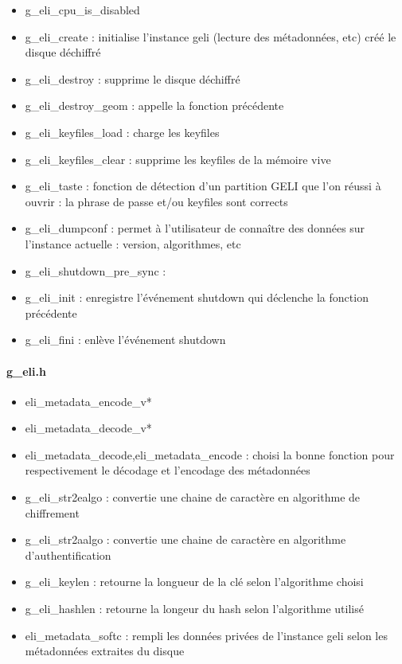 \begin{itemize}
	\item g\_eli\_cpu\_is\_disabled
	\item g\_eli\_create : initialise l'instance geli (lecture des métadonnées, etc)
		créé le disque déchiffré
	\item g\_eli\_destroy : supprime le disque déchiffré
	\item g\_eli\_destroy\_geom : appelle la fonction précédente
	\item g\_eli\_keyfiles\_load : charge les keyfiles
	\item g\_eli\_keyfiles\_clear : supprime les keyfiles de la mémoire vive
	\item g\_eli\_taste : fonction de détection d'un partition GELI que l'on réussi à
		ouvrir : la phrase de passe et/ou keyfiles sont corrects
	\item g\_eli\_dumpconf : permet à l'utilisateur de connaître des données sur 
		l'instance actuelle : version, algorithmes, etc
	\item g\_eli\_shutdown\_pre\_sync : 
	\item g\_eli\_init : enregistre l'événement shutdown qui déclenche la fonction
		précédente
	\item g\_eli\_fini : enlève l'événement shutdown
\end{itemize}

\paragraph{g\_eli.h}
\begin{itemize}
	\item eli\_metadata\_encode\_v*
	\item eli\_metadata\_decode\_v*
	\item eli\_metadata\_decode,eli\_metadata\_encode : choisi la bonne fonction pour 
		respectivement le décodage et l'encodage des métadonnées
	\item g\_eli\_str2ealgo : convertie une chaine de caractère en algorithme de 
		chiffrement
	\item g\_eli\_str2aalgo : convertie une chaine de caractère en algorithme 
		d'authentification
	\item g\_eli\_keylen : retourne la longueur de la clé selon l'algorithme choisi
	\item g\_eli\_hashlen : retourne la longeur du hash selon l'algorithme utilisé
	\item eli\_metadata\_softc : rempli les données privées de l'instance geli 
		selon les métadonnées extraites du disque
\end{itemize}

